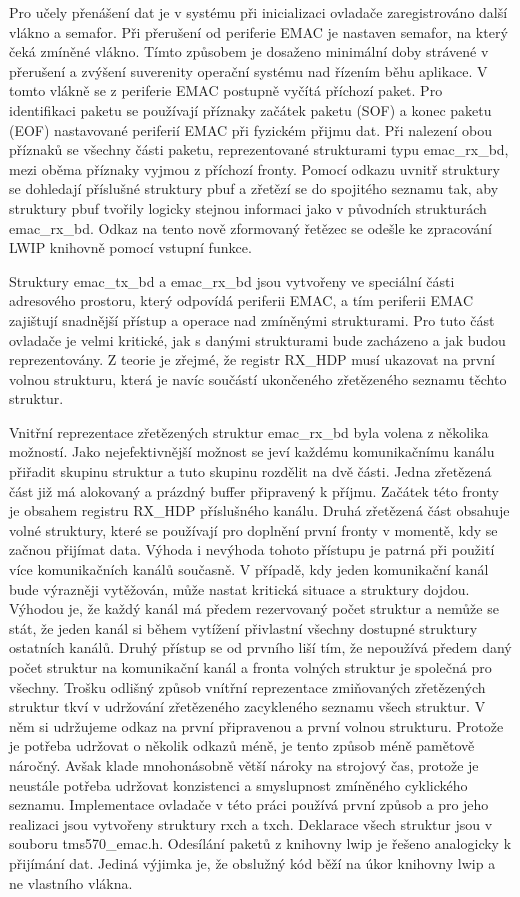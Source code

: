Pro učely přenášení dat je v systému při inicializaci ovladače zaregistrováno další vlákno a semafor.
Při přerušení od periferie EMAC je nastaven semafor, na který čeká zmíněné vlákno.
Tímto způsobem je dosaženo minimální doby strávené v přerušení a zvýšení suverenity operační systému nad řízením běhu aplikace.
V tomto vlákně se z periferie EMAC postupně vyčítá příchozí paket.
Pro identifikaci paketu se používají příznaky začátek paketu (SOF) a konec paketu (EOF) nastavované periferií EMAC při fyzickém přijmu dat.
Při nalezení obou příznaků se všechny části paketu, reprezentované strukturami typu emac\_rx\_bd, mezi oběma příznaky vyjmou z příchozí fronty.
Pomocí odkazu uvnitř struktury se dohledají příslušné struktury pbuf a zřetězí se do spojitého seznamu tak, aby struktury pbuf tvořily logicky stejnou informaci jako v původních strukturách emac\_rx\_bd.
Odkaz na tento nově zformovaný řetězec se odešle ke zpracování LWIP knihovně pomocí vstupní funkce.

Struktury emac\_tx\_bd a emac\_rx\_bd jsou vytvořeny ve speciální části adresového prostoru, který odpovídá periferii EMAC, a tím periferii EMAC zajištují snadnější přístup a operace nad zmíněnými strukturami.
Pro tuto část ovladače je velmi kritické, jak s danými strukturami bude zacházeno a jak budou reprezentovány.
Z teorie je zřejmé, že registr RX\_HDP musí ukazovat na první volnou strukturu, která je navíc součástí ukončeného zřetězeného seznamu těchto struktur.

Vnitřní reprezentace zřetězených struktur emac\_rx\_bd byla volena z několika možností.
Jako nejefektivnější možnost se jeví každému komunikačnímu kanálu přiřadit skupinu struktur a tuto skupinu rozdělit na dvě části.
Jedna zřetězená část již má alokovaný a prázdný buffer připravený k příjmu.
Začátek této fronty je obsahem registru RX\_HDP příslušného kanálu.
Druhá zřetězená část obsahuje volné struktury, které se používají pro doplnění první fronty v momentě, kdy se začnou přijímat data.
Výhoda i nevýhoda tohoto přístupu je patrná při použití více komunikačních kanálů současně.
V případě, kdy jeden komunikační kanál bude výrazněji vytěžován, může nastat kritická situace a struktury dojdou.
Výhodou je, že každý kanál má předem rezervovaný počet struktur a nemůže se stát, že jeden kanál si během vytížení přivlastní všechny dostupné struktury ostatních kanálů.
Druhý přístup se od prvního liší tím, že nepoužívá předem daný počet struktur na komunikační kanál a fronta volných struktur je společná pro všechny.
Trošku odlišný způsob vnítřní reprezentace zmiňovaných zřetězených struktur tkví v udržování zřetězeného zacykleného seznamu všech struktur.
V něm si udržujeme odkaz na první připravenou a první volnou strukturu.
Protože je potřeba udržovat o několik odkazů méně, je tento způsob méně pamětově náročný.
Avšak klade mnohonásobně větší nároky na strojový čas, protože je neustále potřeba udržovat konzistenci a smyslupnost zmíněného cyklického seznamu.
Implementace ovladače v této práci používá první způsob a pro jeho realizaci jsou vytvořeny struktury rxch a txch.
Deklarace všech struktur jsou v souboru tms570\_emac.h.
Odesílání paketů z knihovny lwip je řešeno analogicky k přijímání dat.
Jediná výjimka je, že obslužný kód běží na úkor knihovny lwip a ne vlastního vlákna.

